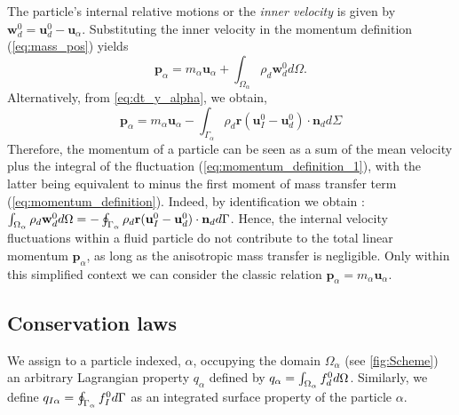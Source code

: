 The particle's internal relative motions or the \textit{inner velocity} is given by $\textbf{w}_d^0 = \textbf{u}_d^0 - \textbf{u}_\alpha$. 
Substituting the inner velocity in the momentum definition (\ref{eq:mass_pos}) yields
\begin{equation}
    \label{eq:momentum_definition_1}
    \textbf{p}_\alpha
    = m_\alpha \textbf{u}_\alpha
    + \int_{\Omega_\alpha} \rho_d \textbf{w}_d^0 d\Omega.
\end{equation}
Alternatively, from \eqref{eq:dt_y_alpha}, we obtain,
\begin{equation}
    \textbf{p}_\alpha
    =  m_\alpha \textbf{u}_\alpha
    - \int_{\Gamma_\alpha} \rho_d\textbf{r}(\textbf{u}_I^0 - \textbf{u}_d^0)\cdot \textbf{n}_d d\Sigma
    \label{eq:momentum_definition}
\end{equation}
Therefore, the momentum of a particle can be seen as a sum of the mean velocity plus the integral of the fluctuation (\ref{eq:momentum_definition_1}), with the latter being equivalent to minus the first moment of mass transfer term (\ref{eq:momentum_definition}).
Indeed, by identification we obtain : $\int_{\Omega_\alpha}  \rho_d \textbf{w}_d^0  d\Omega = - \oint_{\Gamma_\alpha}   \rho_d\textbf{r} (\textbf{u}_I^0 - \textbf{u}_d^0)\cdot \textbf{n}_d  d\Gamma$. 
Hence, the internal velocity fluctuations within a fluid particle do not contribute to the total linear momentum $\textbf{p}_\alpha$, as long as the anisotropic mass transfer is negligible.  
Only within this simplified context we can consider the classic relation $\textbf{p}_\alpha = m_\alpha \textbf{u}_\alpha$. 

\subsection{Conservation laws}

We assign to a particle indexed, $\alpha$, occupying the domain $\Omega_\alpha$ (see \ref{fig:Scheme}) an arbitrary Lagrangian property $q_\alpha$ defined by $q_\alpha  = \int_{\Omega_\alpha}  f_d^0 d\Omega$.
Similarly, we define $q_{I\alpha} = \oint_{\Gamma_\alpha}  f_I^0 d\Gamma$ as an integrated surface property of the particle $\alpha$.

